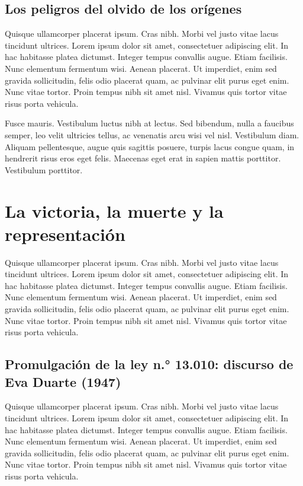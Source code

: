 \section{Los peligros del olvido de los orígenes}

Quisque ullamcorper placerat ipsum. Cras nibh. Morbi vel justo vitae lacus tincidunt ultrices. Lorem ipsum dolor sit amet, consectetuer adipiscing elit. In hac habitasse platea dictumst. Integer tempus convallis augue. Etiam facilisis. Nunc elementum fermentum wisi. Aenean placerat. Ut imperdiet, enim sed gravida sollicitudin, felis odio placerat quam, ac pulvinar elit purus eget enim. Nunc vitae tortor. Proin tempus nibh sit amet nisl. Vivamus quis tortor vitae risus porta vehicula.

Fusce mauris. Vestibulum luctus nibh at lectus. Sed bibendum, nulla a faucibus semper, leo velit ultricies tellus, ac venenatis arcu wisi vel nisl. Vestibulum diam. Aliquam pellentesque, augue quis sagittis posuere, turpis lacus congue quam, in hendrerit risus eros eget felis. Maecenas eget erat in sapien mattis porttitor. Vestibulum porttitor.

\chapter{La victoria, la muerte y la representación}

Quisque ullamcorper placerat ipsum. Cras nibh. Morbi vel justo vitae lacus tincidunt ultrices. Lorem ipsum dolor sit amet, consectetuer adipiscing elit. In hac habitasse platea dictumst. Integer tempus convallis augue. Etiam facilisis. Nunc elementum fermentum wisi. Aenean placerat. Ut imperdiet, enim sed gravida sollicitudin, felis odio placerat quam, ac pulvinar elit purus eget enim. Nunc vitae tortor. Proin tempus nibh sit amet nisl. Vivamus quis tortor vitae risus porta vehicula.

\section{Promulgación de la ley n.° 13.010: discurso de Eva Duarte (1947)}

Quisque ullamcorper placerat ipsum. Cras nibh. Morbi vel justo vitae lacus tincidunt ultrices. Lorem ipsum dolor sit amet, consectetuer adipiscing elit. In hac habitasse platea dictumst. Integer tempus convallis augue. Etiam facilisis. Nunc elementum fermentum wisi. Aenean placerat. Ut imperdiet, enim sed gravida sollicitudin, felis odio placerat quam, ac pulvinar elit purus eget enim. Nunc vitae tortor. Proin tempus nibh sit amet nisl. Vivamus quis tortor vitae risus porta vehicula.

